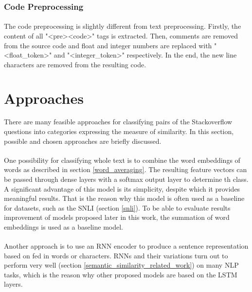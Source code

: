 \subsubsection{Code Preprocessing}
\paragraph{}
The code preprocessing is slightly different from text preprocessing. Firstly, the content of all "<pre><code>" tags is extracted. Then, comments are removed from the source code and float and integer numbers are replaced with "<float\_token>" and  "<integer\_token>" respectively. In the end, the new line characters are removed from the resulting code.

\section{Approaches}
\paragraph{}
There are many feasible approaches for classifying pairs of the Stackoverflow questions into categories expressing the measure of similarity. In this section, possible and chosen approaches are briefly discussed. 

\paragraph{}
One possibility for classifying whole text is to combine the word embeddings of words as described in section \ref{word_averaging}. The resulting feature vectors can be passed through dense layers with a softmax output layer to determine th class. A significant  advantage of this model is its simplicity, despite which it provides meaningful results. That is the reason why this model is often used as a baseline for datasets, such as the SNLI (section \ref{snli}). To be able to evaluate results improvement of models proposed later in this work, the summation of word embeddings is used as a baseline model. 

\paragraph{}
Another approach is to use an RNN encoder to produce a sentence representation based on fed in words or characters. RNNs and their variations turn out to perform very well (section \ref{semantic_similarity_related_work}) on many NLP tasks, which is the reason why other proposed models are based on the LSTM layers.

